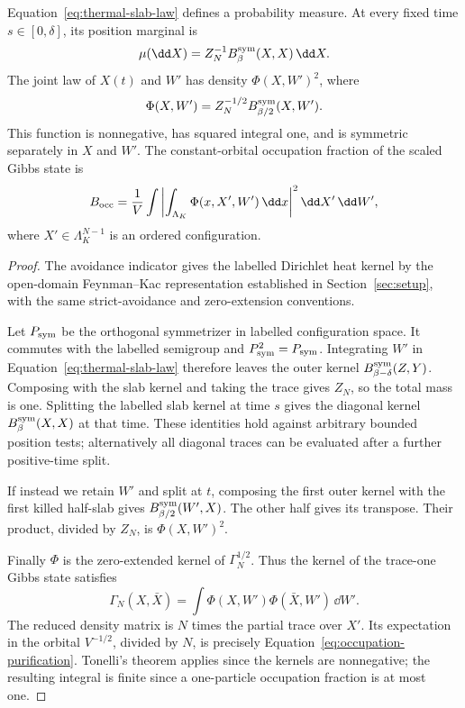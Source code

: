 \begin{proposition}\label{prop:purification}
Equation~\eqref{eq:thermal-slab-law} defines a probability measure.
At every fixed time $s\in[0,\delta]$, its position marginal is
\[
 \mu(\dd X)=Z_N^{-1}B_\beta^{\rm sym}(X,X)\,\dd X.
\]
The joint law of $X(t)$ and $W'$ has density $\Phi(X,W')^2$, where
\begin{equation}\label{eq:thermal-Phi}
 \Phi(X,W')=Z_N^{-1/2}B_{\beta/2}^{\rm sym}(X,W').
\end{equation}
This function is nonnegative, has squared integral one, and is
symmetric separately in $X$ and $W'$.  The constant-orbital
occupation fraction of the scaled Gibbs state is
\begin{equation}\label{eq:occupation-purification}
 B_{\rm occ}
 =\frac1V\int\left|\int_{\Lambda_K}
       \Phi(x,X',W')\,\dd x\right|^2\dd X'\,\dd W',
\end{equation}
where $X'\in\Lambda_K^{N-1}$ is an ordered configuration.
\end{proposition}

\begin{proof}
The avoidance indicator gives the labelled Dirichlet heat kernel by
the open-domain Feynman--Kac representation established in
Section~\ref{sec:setup}, with the same strict-avoidance and zero-extension
conventions.

Let $P_{\rm sym}$ be the orthogonal symmetrizer in labelled
configuration space.  It commutes with the labelled semigroup and
$P_{\rm sym}^2=P_{\rm sym}$.  Integrating $W'$ in
Equation~\eqref{eq:thermal-slab-law} therefore leaves the outer
kernel $B_{\beta-\delta}^{\rm sym}(Z,Y)$.  Composing with the
slab kernel and taking the trace gives $Z_N$, so the total mass
is one.  Splitting the labelled slab kernel at time $s$ gives
the diagonal kernel $B_\beta^{\rm sym}(X,X)$ at that time.
These identities hold against arbitrary bounded position tests;
alternatively all diagonal traces can be evaluated after a further
positive-time split.

If instead we retain $W'$ and split at $t$, composing the first
outer kernel with the first killed half-slab gives
$B_{\beta/2}^{\rm sym}(W',X)$.  The other half gives its transpose.
Their product, divided by $Z_N$, is $\Phi(X,W')^2$.

Finally $\Phi$ is the zero-extended kernel of $\Gamma_N^{1/2}$.
Thus the kernel of the trace-one Gibbs state satisfies
\[
 \Gamma_N(X,\bar X)=\int
       \Phi(X,W')\Phi(\bar X,W')\,\dd W'.
\]
The reduced density matrix is $N$ times the partial trace over
$X'$.  Its expectation in the orbital $V^{-1/2}$, divided by $N$,
is precisely Equation~\eqref{eq:occupation-purification}.
Tonelli's theorem applies since the kernels are nonnegative;
the resulting integral is finite since a one-particle occupation
fraction is at most one.
\end{proof}


